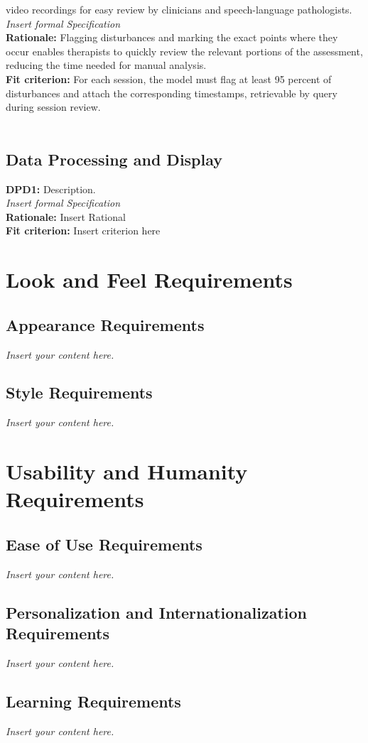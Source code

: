 \documentclass[12pt]{article}
\newcommand{\lips}{\textit{Insert your content here.}}
\begin{document}
video recordings for easy review by clinicians and speech-language pathologists.\\
\textit{Insert formal Specification}\\
\textbf{Rationale: } Flagging disturbances and marking the exact points where they occur enables therapists to 
quickly review the relevant portions of the assessment, reducing the time needed for manual analysis.\\
\textbf{Fit criterion: } For each session, the model must flag at least 95 percent of disturbances and attach 
the corresponding timestamps, retrievable by query during session review.\\\\

\subsection{Data Processing and Display}
\textbf{DPD1: } Description.\\
\textit{Insert formal Specification}\\
\textbf{Rationale: } Insert Rational\\
\textbf{Fit criterion: } Insert criterion here 


\section{Look and Feel Requirements}
\subsection{Appearance Requirements}
\lips
\subsection{Style Requirements}
\lips

\section{Usability and Humanity Requirements}
\subsection{Ease of Use Requirements}
\lips
\subsection{Personalization and Internationalization Requirements}
\lips
\subsection{Learning Requirements}
\lips
\end{document}
